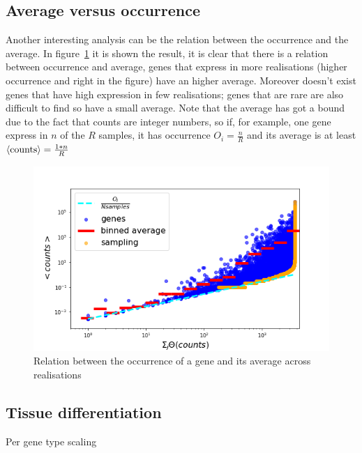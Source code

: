 \subsection{Average versus occurrence}
Another interesting analysis can be the relation between the occurrence and the average. In figure~\ref{fig:scalelaws/gtex/meanDiff_binned_sampling} it is shown the result, it is clear that there is a relation between occurrence and average, genes that express in more realisations (higher occurrence and right in the figure) have an higher average. Moreover doesn't exist genes that have high expression in few realisations; genes that are rare are also difficult to find so have a small average. Note that the average has got a bound due to the fact that counts are integer numbers, so if, for example, one gene express in $n$ of the $R$ samples, it has occurrence $O_i=\frac{n}{R}$ and its average is at least $\left\langle \mathrm{counts}\right\rangle=\frac{1*n}{R}$
\begin{figure}[htb!]
    \centering
    \includegraphics[width=0.9\linewidth]{pictures/scalelaws/gtex/meanDiff_binned_sampling.png}
    \caption{Relation between the occurrence of a gene and its average across realisations}
    \label{fig:scalelaws/gtex/meanDiff_binned_sampling}
\end{figure}

\subsection{Tissue differentiation}
Per gene type scaling


